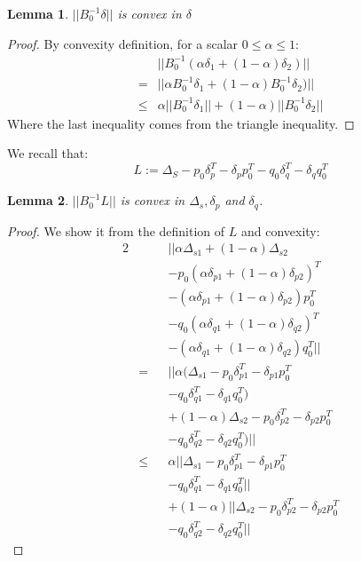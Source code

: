 \documentclass[11pt,twocolumn,varwidth=true,a4paper,fleqn]{article}
\newtheorem{lemma}{Lemma}
\begin{document}
\begin{lemma} \label{delta}
$||B_0^{-1}\delta||$ is convex in $\delta$
\end{lemma}
\begin{proof}
By convexity definition, for a scalar $0 \leq \alpha \leq 1$: 
\begin{equation} 
\begin{split}
& ||B_0^{-1}(\alpha\delta_1+(1-\alpha)\delta_2)|| \\
= & ||\alpha B_0^{-1}\delta_1+(1-\alpha)B_0^{-1}\delta_2)|| \\
\leq & \alpha||B_0^{-1}\delta_1||+(1-\alpha)||B_0^{-1}\delta_2||
\end{split}
\end{equation}
Where the last inequality comes from the triangle inequality.
\end{proof}

We recall that:
\begin{equation*} 
L:= \Delta_S - p_0\delta_p^T - \delta_pp_0^T - q_0\delta_q^T - \delta_qq_0^T
\end{equation*}
\begin{lemma} \label{L}
$||B_0^{-1}L||$ is convex in $\Delta_s, \delta_p$
and $\delta_q$.
\end{lemma}
\begin{proof}
We show it from the definition of $L$ and convexity:
\begin{alignat*} {2}
& && ||\alpha\Delta_{s1}+(1-\alpha)\Delta_{s2} \\
& && - p_0(\alpha\delta_{p1}+(1-\alpha)\delta_{p2})^T \\
& && - (\alpha\delta_{p1}+(1-\alpha)\delta_{p2})p_0^T \\
& && - q_0(\alpha\delta_{q1}+(1-\alpha)\delta_{q2})^T \\
& && - (\alpha\delta_{q1}+(1-\alpha)\delta_{q2})q_0^T || \\
& = && ||\alpha(\Delta_{s1} - p_0\delta_{p1}^T - \delta_{p1}p_0^T \\
& && - q_0\delta_{q1}^T - \delta_{q1}q_0^T) \\
& && + (1-\alpha)\Delta_{s2} - p_0\delta_{p2}^T - \delta_{p2}p_0^T \\
& && - q_0\delta_{q2}^T - \delta_{q2}q_0^T)|| \\
& \leq && \alpha||\Delta_{s1} - p_0\delta_{p1}^T - \delta_{p1}p_0^T \\
& && - q_0\delta_{q1}^T - \delta_{q1}q_0^T|| \\
& && + (1-\alpha)||\Delta_{s2} - p_0\delta_{p2}^T - \delta_{p2}p_0^T \\
& && - q_0\delta_{q2}^T - \delta_{q2}q_0^T||
\end{alignat*}
\end{proof}
\end{document}
